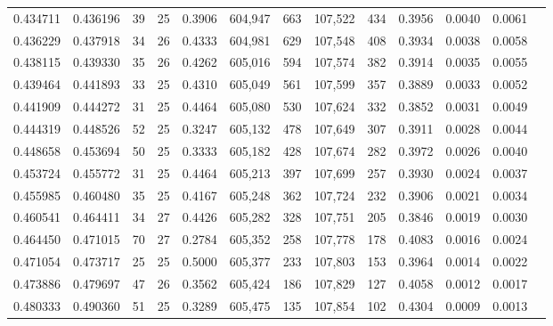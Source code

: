 \begin{tabular}{rrrrrrrrrrrrr}
0.434711 & 0.436196 &  39 &  25 &                                     0.3906 & 604,947 &     663 & 107,522 &     434 & 0.3956 & 0.0040 & 0.0061 \\
0.436229 & 0.437918 &  34 &  26 &                                     0.4333 & 604,981 &     629 & 107,548 &     408 & 0.3934 & 0.0038 & 0.0058 \\
0.438115 & 0.439330 &  35 &  26 &                                     0.4262 & 605,016 &     594 & 107,574 &     382 & 0.3914 & 0.0035 & 0.0055 \\
0.439464 & 0.441893 &  33 &  25 &                                     0.4310 & 605,049 &     561 & 107,599 &     357 & 0.3889 & 0.0033 & 0.0052 \\
0.441909 & 0.444272 &  31 &  25 &                                     0.4464 & 605,080 &     530 & 107,624 &     332 & 0.3852 & 0.0031 & 0.0049 \\
0.444319 & 0.448526 &  52 &  25 &                                     0.3247 & 605,132 &     478 & 107,649 &     307 & 0.3911 & 0.0028 & 0.0044 \\
0.448658 & 0.453694 &  50 &  25 &                                     0.3333 & 605,182 &     428 & 107,674 &     282 & 0.3972 & 0.0026 & 0.0040 \\
0.453724 & 0.455772 &  31 &  25 &                                     0.4464 & 605,213 &     397 & 107,699 &     257 & 0.3930 & 0.0024 & 0.0037 \\
0.455985 & 0.460480 &  35 &  25 &                                     0.4167 & 605,248 &     362 & 107,724 &     232 & 0.3906 & 0.0021 & 0.0034 \\
0.460541 & 0.464411 &  34 &  27 &                                     0.4426 & 605,282 &     328 & 107,751 &     205 & 0.3846 & 0.0019 & 0.0030 \\
0.464450 & 0.471015 &  70 &  27 &                                     0.2784 & 605,352 &     258 & 107,778 &     178 & 0.4083 & 0.0016 & 0.0024 \\
0.471054 & 0.473717 &  25 &  25 &                                     0.5000 & 605,377 &     233 & 107,803 &     153 & 0.3964 & 0.0014 & 0.0022 \\
0.473886 & 0.479697 &  47 &  26 &                                     0.3562 & 605,424 &     186 & 107,829 &     127 & 0.4058 & 0.0012 & 0.0017 \\
0.480333 & 0.490360 &  51 &  25 &                                     0.3289 & 605,475 &     135 & 107,854 &     102 & 0.4304 & 0.0009 & 0.0013 \\

\end{tabular}
